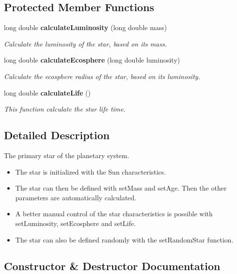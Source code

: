 \subsection*{Protected Member Functions}
\begin{CompactItemize}
\item 
long double {\bf calculate\-Luminosity} (long double mass)
\begin{CompactList}\small\item\em Calculate the luminosity of the star, based on its mass. \item\end{CompactList}\item 
long double {\bf calculate\-Ecosphere} (long double luminosity)
\begin{CompactList}\small\item\em Calculate the ecosphere radius of the star, based on its luminosity. \item\end{CompactList}\item 
long double {\bf calculate\-Life} ()
\begin{CompactList}\small\item\em This function calculate the star life time. \item\end{CompactList}\end{CompactItemize}


\subsection{Detailed Description}
The primary star of the planetary system. 

\begin{itemize}
\item The star is initialized with the Sun characteristics.\item The star can then be defined with set\-Mass and set\-Age. Then the other parameters are automatically calculated.\item A better manual control of the star characteristics is possible with set\-Luminosity, set\-Ecosphere and set\-Life.\item The star can also be defined randomly with the set\-Random\-Star function. \end{itemize}




\subsection{Constructor \& Destructor Documentation}

